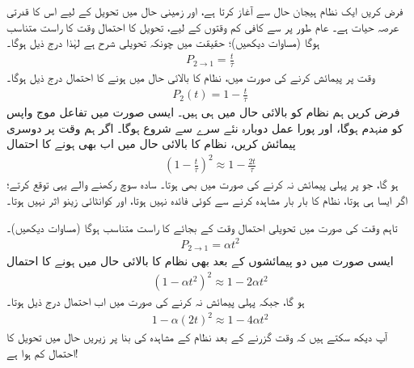 فرض کریں ایک نظام ہیجان حال  سے آغاز کرتا ہے، اور زمینی حال  میں تحویل کے لیے اس کا قدرتی عرصہ حیات  ہے۔ عام طور پر  سے کافی کم وقتوں کے لیے، تحویل کا احتمال وقت  کا راست متناسب ہوگا (مساوات  دیکھیں)؛ حقیقت میں چونکہ تحویلی شرح  ہے لہٰذا درج ذیل ہوگا۔
\begin{align}
	P_{2\to1}=\frac{t}{\tau}
\end{align}
وقت  پر پیمائش کرنے کی صورت میں، نظام کا بالائی حال میں ہونے کا احتمال درج ذیل ہوگا۔
\begin{align}
	P_2(t)=1-\frac{t}{\tau}
\end{align}
فرض کریں ہم نظام کو بالائی حال میں ہی  ہیں۔ ایسی صورت میں تفاعل موج واپس  کو منہدم ہوگا، اور پورا عمل دوبارہ نئے سرے سے شروع ہوگا۔ اگر ہم وقت  پر دوسری پیمائش کریں، نظام کا بالائی حال میں اب بھی ہونے کا احتمال 
\begin{align}
	\left(1-\frac{t}{\tau}\right)^2\approx1-\frac{2t}{\tau}
\end{align}
ہو گا، جو  پر پہلی پیمائش نہ کرنے کی صورت میں بھی ہوتا۔ سادہ سوچ رکھنے والے یہی توقع کرتے؛ اگر ایسا ہی ہوتا، نظام کا بار بار مشاہدہ کرنے سے کوئی فائدہ نہیں ہوتا، اور کوانٹائی زینو اثر نہیں ہوتا۔

 تاہم  وقت کی صورت میں تحویلی احتمال وقت  کے بجائے  کا راست متناسب ہوگا (مساوات  دیکھیں)۔
\begin{align}
	P_{2\to1}=\alpha t^2
\end{align}
ایسی صورت میں دو پیمائشوں کے بعد بھی نظام کا بالائی حال میں ہونے کا احتمال
\begin{align}
	\left(1-\alpha t^2\right)^2\approx 1-2\alpha t^2
\end{align}
ہو گا، جبکہ پہلی پیمائش نہ کرنے کی صورت میں اب احتمال درج ذیل ہوتا۔
\begin{align}
	1-\alpha(2t)^2\approx1-4\alpha t^2
\end{align}
آپ دیکھ سکتے ہیں کہ وقت  گزرنے کے بعد نظام کے مشاہدہ کی بنا پر زیریں حال میں تحویل کا احتمال کم ہوا ہے!

